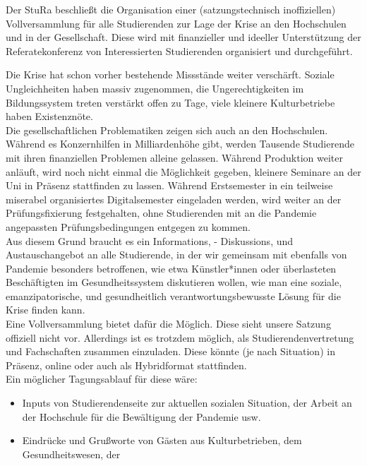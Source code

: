 {
    Der StuRa beschließt die Organisation einer (satzungstechnisch inoffiziellen) Vollversammlung
    für alle Studierenden zur Lage der Krise an den Hochschulen und in der Gesellschaft.
    Diese wird mit finanzieller und ideeller Unterstützung der Referatekonferenz von Interessierten
    Studierenden organisiert und durchgeführt. 
}{
    Die Krise hat schon vorher bestehende Missstände weiter verschärft. Soziale Ungleichheiten haben
    massiv zugenommen, die Ungerechtigkeiten im Bildungssystem treten verstärkt offen zu Tage, viele
    kleinere Kulturbetriebe haben Existenznöte.\\
    Die gesellschaftlichen Problematiken zeigen sich auch an den Hochschulen. Während es Konzernhilfen
    in Milliardenhöhe gibt, werden Tausende Studierende mit ihren finanziellen Problemen alleine
    gelassen. Während Produktion weiter anläuft, wird noch nicht einmal die Möglichkeit gegeben,
    kleinere Seminare an der Uni in Präsenz stattfinden zu lassen. Während Erstsemester in ein
    teilweise miserabel organisiertes Digitalsemester eingeladen werden, wird weiter an der
    Prüfungsfixierung festgehalten, ohne Studierenden mit an die Pandemie angepassten Prüfungsbedingungen
    entgegen zu kommen.\\
    Aus diesem Grund braucht es ein Informations, - Diskussions, und Austauschangebot an alle 
    Studierende, in der wir gemeinsam mit ebenfalls von Pandemie besonders betroffenen, wie etwa
    Künstler*innen oder überlasteten Beschäftigten im Gesundheitssystem diskutieren wollen, wie man eine
    soziale, emanzipatorische, und gesundheitlich verantwortungsbewusste Lösung für die Krise finden
    kann.\\
    Eine Vollversammlung bietet dafür die Möglich. Diese sieht unsere Satzung offiziell nicht vor.
    Allerdings ist es trotzdem möglich, als Studierendenvertretung und Fachschaften zusammen einzuladen.
    Diese könnte (je nach Situation) in Präsenz, online oder auch als Hybridformat stattfinden.\\
    Ein möglicher Tagungsablauf für diese wäre:\\
    \begin{itemize}
        \item Inputs von Studierendenseite zur aktuellen sozialen Situation, der Arbeit an der Hochschule
            für die Bewältigung der Pandemie usw.
        \item Eindrücke und Grußworte von Gästen aus Kulturbetrieben, dem Gesundheitswesen, der

\end{itemize}}
